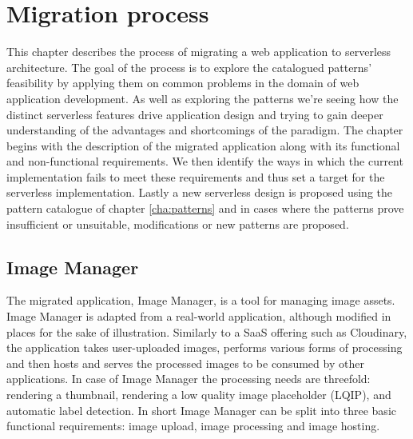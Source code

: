 \chapter{Migration process} \label{cha:migration}

This chapter describes the process of migrating a web application to serverless architecture. The goal of the process is to explore the catalogued patterns' feasibility by applying them on common problems in the domain of web application development. As well as exploring the patterns we're seeing how the distinct serverless features drive application design and trying to gain deeper understanding of the advantages and shortcomings of the paradigm. The chapter begins with the description of the migrated application along with its functional and non-functional requirements. We then identify the ways in which the current implementation fails to meet these requirements and thus set a target for the serverless implementation. Lastly a new serverless design is proposed using the pattern catalogue of chapter \ref{cha:patterns} and in cases where the patterns prove insufficient or unsuitable, modifications or new patterns are proposed.

\section{Image Manager}

The migrated application, Image Manager, is a tool for managing image assets. Image Manager is adapted from a real-world application, although modified in places for the sake of illustration. Similarly to a SaaS offering such as Cloudinary, the application takes user-uploaded images, performs various forms of processing and then hosts and serves the processed images to be consumed by other applications. In case of Image Manager the processing needs are threefold: rendering a thumbnail, rendering a low quality image placeholder (LQIP), and automatic label detection. In short Image Manager can be split into three basic functional requirements: image upload, image processing and image hosting.

